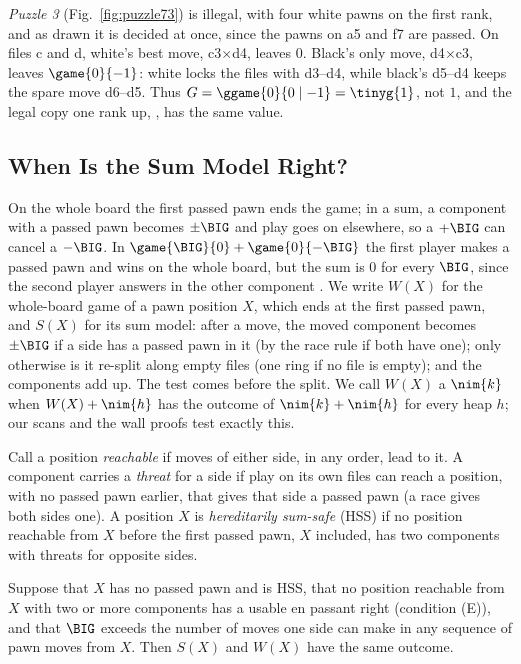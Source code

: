\emph{Puzzle 3} (Fig.~\ref{fig:puzzle73}) is illegal, with four white pawns on the first rank, and as drawn it
is decided at once, since the pawns on a5 and f7 are passed. On files c and d, white's best move, c3$\times$d4,
leaves $0$. Black's only move, d4$\times$c3, leaves $\game{0}{-1}$: white locks the files with d3--d4, while
black's d5--d4 keeps the spare move d6--d5. Thus $G=\ggame{0}{0\mid -1}=\tinyg{1}$, not $1$, and the legal copy
one rank up, , has the same value.

\subsection{When Is the Sum Model Right?}\label{sec:sums-hss}

On the whole board the first passed pawn ends the game; in a sum, a component with a passed pawn becomes $\pm\BIG$ and
play goes on elsewhere, so a $+\BIG$ can cancel a $-\BIG$. In $\game{\BIG}{0}+\game{0}{-\BIG}$ the first player
makes a passed pawn and wins on the whole board, but the sum is $0$ for every $\BIG$, since the second player
answers in the other component . We write $W(X)$ for the whole-board game of a pawn position $X$, which ends at
the first passed pawn, and $S(X)$ for its sum model: after a move, the moved component becomes $\pm\BIG$ if a
side has a passed pawn in it (by the race rule if both have one); only otherwise is it re-split along empty files (one ring
if no file is empty); and the components add up. The test comes before the split. We call $W(X)$ a $\nim{k}$ when $W(X)+\nim{h}$ has
the outcome of $\nim{k}+\nim{h}$ for every heap $h$; our scans and the wall proofs test exactly this.

\begin{definition}\label{def:hss}
Call a position \emph{reachable} if moves of either side, in any order, lead to it. A component carries a
\emph{threat} for a side if play on its own files can reach a position, with no passed pawn earlier, that gives that side a passed pawn (a race gives both sides one). A position $X$ is
\emph{hereditarily sum-safe} (HSS) if no position reachable from $X$ before the first passed pawn, $X$ included, has two components with threats for opposite sides.
\end{definition}

\begin{theorem}\label{thm:hss}
Suppose that $X$ has no passed pawn and is HSS, that no position reachable from $X$ with two or more components has a usable en
passant right (condition (E)), and that $\BIG$ exceeds the number of moves one side can make in any sequence of pawn moves from $X$. Then $S(X)$ and $W(X)$ have the same
outcome.
\end{theorem}

